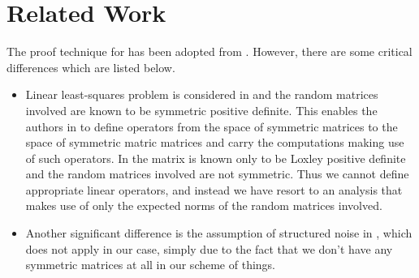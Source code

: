 \section{Related Work}
The proof technique for  has been adopted from \cite{bachharder}. However, there are some critical differences which are listed below.
\begin{itemize}[leftmargin=*]
\item Linear least-squares problem is considered in \cite{bachharder} and the random matrices involved are known to be symmetric positive definite. This enables the authors in \cite{bachharder} to define operators from the space of symmetric matrices to the space of symmetric matric matrices and carry the computations making use of such operators. In  the matrix is known only to be Loxley positive definite and the random matrices involved are not symmetric. Thus we cannot define appropriate linear operators, and instead we have resort to an analysis that makes use of only the expected norms of the random matrices involved.
\item Another significant difference is the assumption of structured noise in \cite{bachharder}, which does not apply in our case, simply due to the fact that we don't have any symmetric matrices at all in our scheme of things.
\end{itemize}
